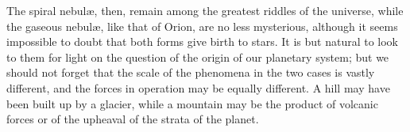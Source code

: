The spiral nebul{\ae}, then, remain among the greatest riddles of the
universe, while the gaseous nebul{\ae}, like that of Orion, are no less
mysterious, although it seems impossible to doubt that both forms give
birth to stars. It is but natural to look to them for light on the
question of the origin of our planetary system; but we should not
forget that the scale of the phenomena in the two cases is vastly
different, and the forces in operation may be equally different. A
hill may have been built up by a glacier, while a mountain may be the
product of volcanic forces or of the upheaval of the strata of the
planet. 









